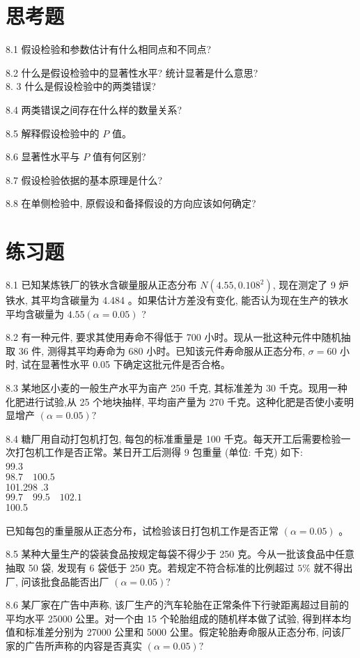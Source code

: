 \documentclass[10pt]{article}
\begin{document}
\begin{CJK*}{UTF8}{bsmi}
\section*{思考题}
8.1 假设检验和参数估计有什么相同点和不同点?

8.2 什么是假设检验中的显著性水平? 统计显著是什么意思?\\
8. 3 什么是假设检验中的两类错误?

8.4 两类错误之间存在什么样的数量关系?

8.5 解释假设检验中的 $P$ 值。

8.6 显著性水平与 $P$ 值有何区别?

8.7 假设检验依据的基本原理是什么?

8.8 在单侧检验中, 原假设和备择假设的方向应该如何确定?

\section*{练习题}
8.1 已知某炼铁厂的铁水含碳量服从正态分布 $N\left(4.55,0.108^{2}\right)$, 现在测定了 9 炉铁水, 其平均含碳量为 4.484 。如果估计方差没有变化, 能否认为现在生产的铁水平均含碳量为 $4.55(\alpha=0.05)$ ?

8.2 有一种元件, 要求其使用寿命不得低于 700 小时。现从一批这种元件中随机抽取 36 件, 测得其平均寿命为 680 小时。已知该元件寿命服从正态分布, $\sigma=60$ 小时, 试在显著性水平 0.05 下确定这批元件是否合格。

8.3 某地区小麦的一般生产水平为亩产 250 千克, 其标准差为 30 千克。现用一种化肥进行试验,从 25 个地块抽样, 平均亩产量为 270 千克。这种化肥是否使小麦明显增产 $(\alpha=0.05) ?$

8.4 糖厂用自动打包机打包, 每包的标准重量是 100 千克。每天开工后需要检验一次打包机工作是否正常。某日开工后测得 9 包重量 (单位: 千克) 如下:\\
99.3\\
$98.7 \quad 100.5$\\
101.298 .3\\
$99.7 \quad 99.5 \quad 102.1$\\
100.5

已知每包的重量服从正态分布，试检验该日打包机工作是否正常 $(\alpha=0.05)$ 。

8.5 某种大量生产的袋装食品按规定每袋不得少于 250 克。今从一批该食品中任意抽取 50 袋, 发现有 6 袋低于 250 克。若规定不符合标准的比例超过 $5 \%$ 就不得出厂, 问该批食品能否出厂 $(\alpha=0.05) ?$

8.6 某厂家在广告中声称, 该厂生产的汽车轮胎在正常条件下行驶距离超过目前的平均水平 25000 公里。对一个由 15 个轮胎组成的随机样本做了试验, 得到样本均值和标准差分别为 27000 公里和 5000 公里。假定轮胎寿命服从正态分布, 问该厂家的广告所声称的内容是否真实 $(\alpha=0.05) ?$


\end{CJK*}
\end{document}
